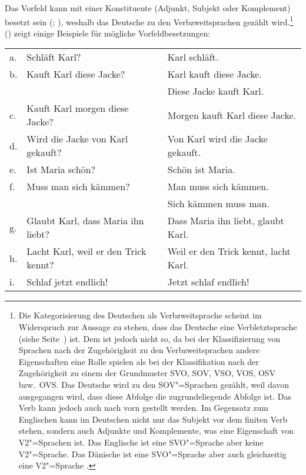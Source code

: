 Das Vorfeld kann mit einer Konstituente (Adjunkt, Subjekt oder Komplement) besetzt sein (\citealp[Kapitel~2.4]{Erdmann1886a};
\citealp[, S.\,77]{Paul1919a}), weshalb das Deutsche zu den Verbzweitsprachen gezählt wird.\footnote{%
  Die Kategorisierung des Deutschen als Verbzweitsprache scheint im Widerspruch zur Aussage zu stehen, 
  dass das Deutsche eine Verbletztsprache (siehe Seite~\pageref{page-verbletzt}) ist. Dem ist
  jedoch nicht so, da bei der Klassifizierung von Sprachen nach der Zugehörigkeit zu den Verbzweitsprachen
  andere Eigenschaften eine Rolle spielen als bei der Klassifikation nach der Zugehörigkeit zu einem
  der Grundmuster SVO, SOV, VSO, VOS, OSV bzw.\ OVS. Das Deutsche wird zu den SOV"=Sprachen gezählt,
  weil davon ausgegangen wird, dass diese Abfolge die zugrundeliegende Abfolge ist. Das Verb kann jedoch auch nach 
  vorn gestellt werden. Im Gegensatz zum Englischen kann im Deutschen nicht nur
  das Subjekt vor dem finiten Verb stehen, sondern auch Adjunkte und Komplemente, was eine Eigenschaft
  von V2"=Sprachen ist. Das Englische ist eine SVO"=Sprache aber keine V2"=Sprache. Das Dänische ist
  eine SVO"=Sprache aber auch gleichzeitig eine V2"=Sprache \citep{Vikner95a-u,MOeDanish}.%
}
() zeigt einige Beispiele für mögliche Vorfeldbesetzungen:
\ea
\label{fragen}
\begin{tabular}[t]{@{}l@{~}ll}
a. & Schläft Karl?                                        & Karl schläft.\\
b. & Kauft Karl diese Jacke?                              & Karl kauft diese Jacke.\\
   &                                                      & Diese Jacke kauft Karl.\\
c. & Kauft Karl morgen diese Jacke?                       & Morgen kauft Karl diese Jacke.\\
d. & Wird die Jacke von Karl gekauft?                     & Von Karl wird die Jacke gekauft.\\
e. & Ist Maria schön?                                     & Schön ist Maria.\\
f. & Muss man sich kämmen?                                 & Man muss sich kämmen.\\
   &                                                      & Sich kämmen muss man.\\
g. & Glaubt Karl, dass Maria ihn liebt?                    & Dass Maria ihn liebt, glaubt Karl.\\
h. & Lacht Karl, weil er den Trick kennt?   & Weil er den Trick kennt, lacht Karl.\\
i. & Schlaf jetzt endlich!                                & Jetzt schlaf endlich!\\
\end{tabular}
\z


